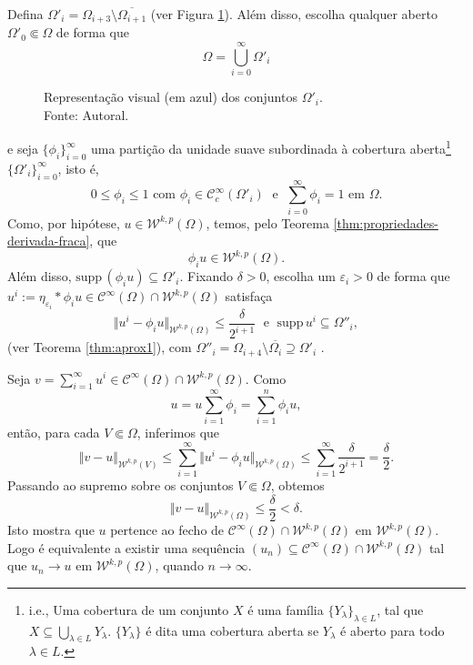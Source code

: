 \documentclass[a4paper, 11pt]{book}
\theoremstyle{definition}
\newcommand{\cC}{\mathcal{C}}
\newcommand{\cW}{\mathcal{W}}
\newcommand{\supp}{\mathrm{supp}\,}
\begin{document}
\begin{prf}
    Defina $\Omega'_i = \Omega_{i+3} \setminus \overline{\Omega_{i+1}}$ (ver Figura \ref{fig:omegaii}).
    Além disso, escolha qualquer aberto $\Omega'_0 \Subset \Omega$ de forma que
    \[
        \Omega = \bigcup_{i=0}^\infty \Omega'_i
    \]
    \begin{figure}
        \centering
        
        \caption{Representação visual (em azul) dos conjuntos $\Omega'_i$.\\Fonte: Autoral.}
        \label{fig:omegaii}
    \end{figure}
    e seja $\{\phi_i\}_{i=0}^\infty$ uma partição da unidade suave subordinada à cobertura aberta\footnote{i.e., Uma cobertura de um conjunto $X$ é uma família $\{Y_\lambda\}_{\lambda\in L}$, tal que $X \subseteq \bigcup_{\lambda \in L} Y_\lambda$. $\{Y_\lambda\}$ é dita uma cobertura aberta se $Y_\lambda$ é aberto para todo $\lambda \in L$.} $\{\Omega'_i\}_{i=0}^\infty$, isto é,
    \[
       0 \leqslant \phi_i \leqslant 1 \text{ com } \phi_i \in \cC^\infty_c(\Omega'_i) \;\text{ e }\; \sum_{i=0}^\infty \phi_i = 1 \text{ em } \Omega.
    \]
    Como, por hipótese, $u \in \cW^{k,p}(\Omega)$, temos, pelo Teorema \ref{thm:propriedades-derivada-fraca}, que
    \[
        \phi_i u \in \cW^{k,p}(\Omega).
    \]
    Além disso, $\supp(\phi_i u) \subseteq \Omega'_i$.
    Fixando $\delta > 0$, escolha um $\varepsilon_i > 0$ de forma que $u^i := \eta_{\varepsilon_i} * \phi_i u \in \cC^{\infty}(\Omega) \cap \cW^{k,p}(\Omega)$ satisfaça
    \[
        \Vert u^i - \phi_i u \Vert_{\cW^{k,p}(\Omega)} \leqslant \frac{\delta}{2^{i+1}} \;\text{ e }\; \supp u^i \subseteq \Omega''_i,
    \]
    (ver Teorema \ref{thm:aprox1}),
    com $\Omega''_i = \Omega_{i+4} \setminus \overline{\Omega_{i}} \supseteq \Omega'_i$ .

    Seja $v = \sum_{i=1}^\infty u^i \in \cC^{\infty}(\Omega) \cap \cW^{k,p}(\Omega)$.
    Como 
    \[
        u = u \sum_{i=1}^\infty \phi_i = \sum_{i=1}^n \phi_i u,
    \]
    então, para cada $V \Subset \Omega$, inferimos que
    \[
        \Vert v - u \Vert_{\cW^{k,p}(V)} \leqslant \sum_{i=1}^\infty \Vert u^i - \phi_i u \Vert_{\cW^{k,p}(\Omega)} \leqslant \sum_{i=1}^\infty \frac{\delta}{2^{i+1}} = \frac{\delta}{2}.
    \]
    Passando ao supremo sobre os conjuntos $V \Subset \Omega$, obtemos
    \[
        \Vert v - u \Vert_{\cW^{k,p}(\Omega)} \leqslant \frac{\delta}{2} < \delta.
    \]
    Isto mostra que $u$ pertence ao fecho de $\cC^\infty(\Omega) \cap \cW^{k,p}(\Omega)$ em $\cW^{k,p}(\Omega)$. Logo é equivalente a existir uma sequência $(u_n) \subseteq \cC^\infty(\Omega) \cap \cW^{k,p}(\Omega)$ tal que $u_n \to u$ em $\cW^{k,p}(\Omega)$, quando $n \to \infty$.
\end{prf}
\end{document}
